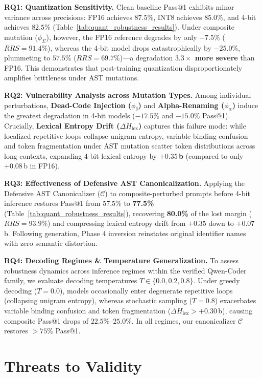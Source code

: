 \documentclass[11pt,twocolumn]{article}
\begin{document}
\noindent\textbf{RQ1: Quantization Sensitivity.} Clean baseline Pass@1 exhibits minor variance across precisions: FP16 achieves $87.5\%$, INT8 achieves $85.0\%$, and 4-bit achieves $82.5\%$ (Table~\ref{tab:quant_robustness_results}). Under composite mutation ($\phi_\Sigma$), however, the FP16 reference degrades by only $-7.5\%$ ($RRS = 91.4\%$), whereas the 4-bit model drops catastrophically by \textbf{$-25.0\%$}, plummeting to $57.5\%$ ($RRS = 69.7\%$)---a degradation \textbf{$3.3\times$ more severe} than FP16. This demonstrates that post-training quantization disproportionately amplifies brittleness under AST mutations.

\noindent\textbf{RQ2: Vulnerability Analysis across Mutation Types.} Among individual perturbations, \textbf{Dead-Code Injection ($\phi_\delta$)} and \textbf{Alpha-Renaming ($\phi_\alpha$)} induce the greatest degradation in 4-bit models ($-17.5\%$ and $-15.0\%$ Pass@1). Crucially, \textbf{Lexical Entropy Drift ($\Delta H_{\text{lex}}$)} captures this failure mode: while localized repetitive loops collapse unigram entropy, variable binding confusion and token fragmentation under AST mutation scatter token distributions across long contexts, expanding 4-bit lexical entropy by \textbf{$+0.35$\,b} (compared to only $+0.08$\,b in FP16).

\noindent\textbf{RQ3: Effectiveness of Defensive AST Canonicalization.} Applying the Defensive AST Canonicalizer ($\mathcal{C}$) to composite-perturbed prompts before 4-bit inference restores Pass@1 from $57.5\%$ to \textbf{77.5\%} (Table~\ref{tab:quant_robustness_results}), recovering \textbf{80.0\%} of the lost margin ($RRS = 93.9\%$) and compressing lexical entropy drift from $+0.35$ down to $+0.07$\,b. Following generation, Phase 4 inversion reinstates original identifier names with zero semantic distortion.

\noindent\textbf{RQ4: Decoding Regimes \& Temperature Generalization.} To assess robustness dynamics across inference regimes within the verified Qwen-Coder family, we evaluate decoding temperatures $T \in \{0.0, 0.2, 0.8\}$. Under greedy decoding ($T=0.0$), models occasionally enter degenerate repetitive loops (collapsing unigram entropy), whereas stochastic sampling ($T=0.8$) exacerbates variable binding confusion and token fragmentation ($\Delta H_{\text{lex}} > +0.30$\,b), causing composite Pass@1 drops of $22.5\%\text{--}25.0\%$. In all regimes, our canonicalizer $\mathcal{C}$ restores $>75\%$ Pass@1.

\section{Threats to Validity}
\label{sec:threats}
\end{document}
